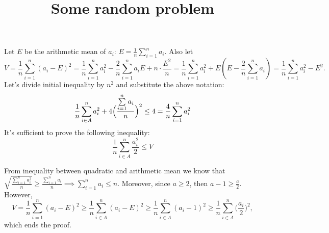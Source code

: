 \documentclass{article}
\title{Some random problem}
\date{}
\begin{document}
Let \(E\) be the arithmetic mean of \(a_i\): \(E = \frac{1}{n}\sum_{i=1}^{n} a_i\). Also let 
\[
    V = \frac{1}{n}\sum_{i=1}^{n} (a_{i}-E)^2 = \frac{1}{n}\sum_{i=1}^{n} a_i^2 - \frac{2}{n} \sum_{i=1}^{n} a_i E + n \cdot \frac{E^2}{n} = \frac{1}{n} \sum_{i=1}^{n} a_i^2 + E(E-\frac{2}{n}\sum_{i=1}^{n} a_i) = \frac{1}{n}\sum_{i=1}^{n} a_i^2 - E^2.
\] 
Let's divide initial inequality by \(n^2\) and substitute the above notation:
\[
    \frac{1}{n}\sum_{i\in A}^{n} a_i^2 + 4 \Bigl( \frac{\sum\limits_{i=1}^{n} a_i}{n} \Bigr) ^2 \leq 4 = \frac{4}{n} \sum_{i=1}^{n} a_i^2
\]
It's sufficient to prove the following inequality:
\[
  \frac{1}{n}\sum_{i\in A}^{n} \frac{a_i^2}{2} \leq V 
\]

From inequality between quadratic and arithmetic mean we know that \( \sqrt{\frac{\sum_{i=1}^{n} a_i^2}{n} }\geq  \frac{\sum_{i=1}^{n} a_i}{n} \implies \sum_{i=1}^{n} a_i \leq n \). 
Moreover, since \(a \geq 2 \), then \(a-1 \geq \frac{a}{2}\).  
However, 
\[
    V = \frac{1}{n}\sum_{i=1}^{n} (a_i - E)^2 \geq \frac{1}{n}\sum_{i\in A}^{n} (a_{i}-E)^2 \geq \frac{1}{n}\sum_{i\in A}^{n} (a_i -1)^2 \geq \frac{1}{n}\sum_{i\in A}^{n} \bigl(\frac{a_i}{2} \bigr) ^2, 
\]
which ends the proof.
\end{document}
